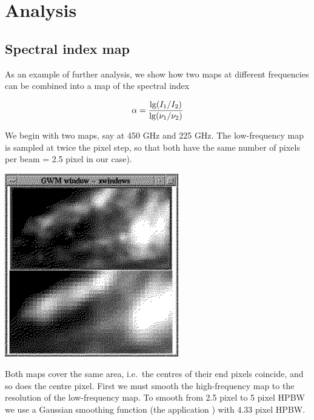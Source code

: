 \documentclass[11pt,noabs]{starlink}
\begin{document}
\newpage
\section{Analysis}

\subsection{\label{spindex}Spectral index map}

   As an example of further analysis, we show how two maps at different
   frequencies can be combined into a map of the spectral index

\[\alpha = {\lg(I_1/I_2) \over \lg(\nu_1/\nu_2)}\]

   We begin with two maps, say at 450 GHz and 225 GHz. The low-frequency
   map is sampled at twice the pixel step, so that both have the same
   number of pixels per beam
   = 2.5 pixel in our case).

\begin{center}
\leavevmode\includegraphics[height=80mm]{sc1_spindex1}
\end{center}

   Both maps cover the same area, i.e.\ the centres of their end pixels
   coincide, and so does the centre pixel.
   First we must smooth the high-frequency map to the resolution of the
   low-frequency map. To smooth from 2.5 pixel to 5 pixel HPBW we
   use a Gaussian smoothing function (the application
\texttt{})
   with 4.33 pixel HPBW.

\begin{terminalv}
\end{terminalv}
\end{document}
